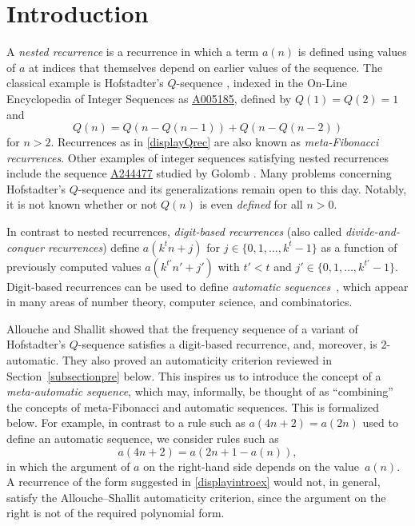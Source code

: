 \documentclass[12pt,reqno]{article}
\newcommand{\seqnum}[1]{\href{https://oeis.org/#1}{\rm \underline{#1}}}
\theoremstyle{plain}
\theoremstyle{definition}
\theoremstyle{remark}
\begin{document}
\section{Introduction}
 A \emph{nested recurrence} is a recurrence in which a term $a(n)$ is defined using values of $a$ at indices that themselves depend on 
 earlier values of the sequence. The classical example is Hofstadter's $Q$-sequence \cite[p.\ 137]{Hofstadter1979}, indexed in the 
 On-Line Encyclopedia of Integer Sequences \cite{oeis} as \seqnum{A005185}, defined by $Q(1)=Q(2)=1$ and
\begin{equation}\label{displayQrec} 
 Q(n) = Q(n-Q(n-1)) + Q(n-Q(n-2)) 
\end{equation}
 for $n>2$. Recurrences as in \eqref{displayQrec} are also known as \emph{meta-Fibonacci recurrences}. Other examples of integer 
 sequences satisfying nested recurrences include the sequence \seqnum{A244477} studied by Golomb \cite{Golomb1990}. Many 
 problems concerning Hofstadter's $Q$-sequence and its generalizations remain open to this day. Notably, it is not known whether or 
 not $Q(n)$ is even \emph{defined} for all $n>0$.

 In contrast to nested recurrences, \emph{digit-based recurrences} (also called \emph{divide-and-conquer recurrences}) define 
 $a(k^{t}n+j)$ for $j\in\{0,1,\ldots,k^{t}-1\}$
 as a function of previously computed values $a(k^{t'}n'+j')$ with $t'<t$ and
 $j'\in\{0,1,\ldots,k^{t'}-1\}$. Digit-based recurrences can be used to define \emph{automatic
 sequences}~\cite{AlloucheShallit2003,Cobham1972}, 
 which appear in many areas of number
 theory, computer science, and combinatorics.

 Allouche and Shallit \cite{AlloucheShallit2012} showed that the frequency sequence of a variant of Hofstadter's $Q$-sequence satisfies a 
 digit-based recurrence, and, moreover, is $2$-automatic. They also proved an automaticity criterion 
 \cite[Theorem~2.2]{AlloucheShallit2012} reviewed in Section~\ref{subsectionpre} below. This inspires us to introduce the concept of a 
 \emph{meta-automatic sequence}, which may, informally, be thought of as ``combining'' the concepts of meta-Fibonacci and 
 automatic sequences. This is formalized below. For example, in contrast to a rule such as $a(4n+2) = a(2n)$ used to define an 
 automatic sequence, we consider rules such as
 \begin{equation}\label{displayintroex} 
 a(4 n + 2) = a(2n + 1 - a(n)),
 \end{equation}
 in which the argument of $a$ on the right-hand side depends on the value~$a(n)$. A recurrence of the form suggested in 
 \eqref{displayintroex} would not, in general, satisfy the Allouche--Shallit automaticity criterion, since the argument on the right is not 
 of the required polynomial form. 
\end{document}
